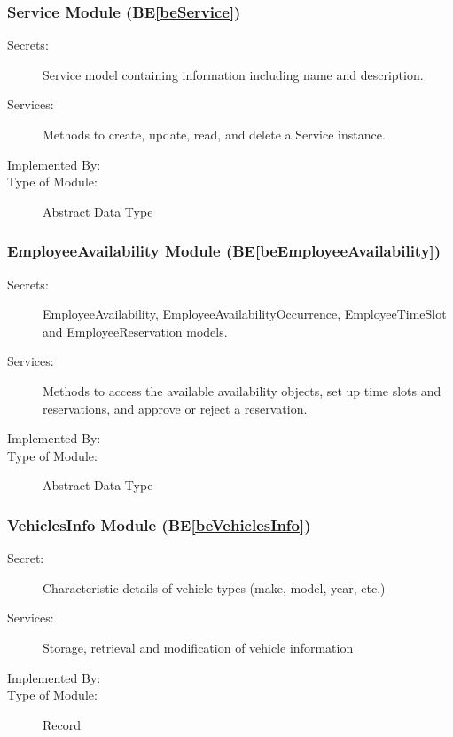 \documentclass[12pt, titlepage]{article}
\newcommand{\beref}[1]{BE\ref{#1}}
\newcommand{\labelbedef}[1]{\label{be#1def}}
\begin{document}
\subsubsection{Service Module (\beref{beService}) \labelbedef{Service}}

\begin{description}
\item[Secrets:] Service model containing information including name and description.
\item[Services:] Methods to create, update, read, and delete a Service instance.
\item[Implemented By:] \progname
\item[Type of Module:] Abstract Data Type
\end{description}



\subsubsection{EmployeeAvailability Module (\beref{beEmployeeAvailability}) \labelbedef{EmployeeAvailability}}

\begin{description}
\item[Secrets:] EmployeeAvailability, EmployeeAvailabilityOccurrence, EmployeeTimeSlot and EmployeeReservation models.
\item[Services:] Methods to access the available availability objects, set up time slots and reservations, and approve or reject a reservation. 
\item[Implemented By:] \progname
\item[Type of Module:] Abstract Data Type
\end{description}

\subsubsection{VehiclesInfo Module (\beref{beVehiclesInfo}) \labelbedef{VehiclesInfo}}
\begin{description}
    \item[Secret:] Characteristic details of vehicle types (make, model, year, etc.)
    \item[Services:] Storage, retrieval and modification of vehicle information
    \item[Implemented By:] \progname
    \item[Type of Module:] Record
\end{description}
\end{document}
